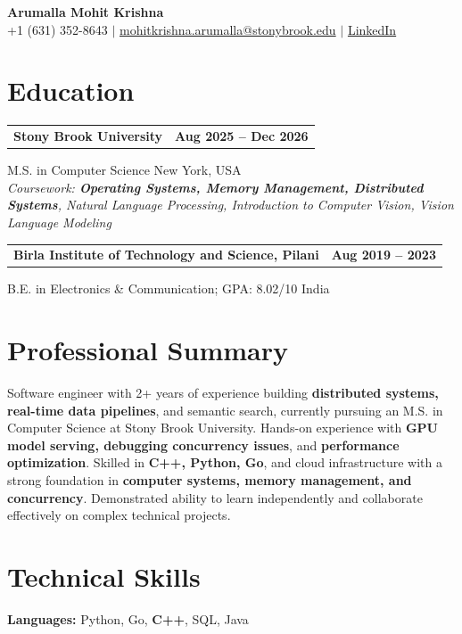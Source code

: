 \documentclass[letterpaper,10pt]{article}
\makeatletter
\newcommand{\entry}[2]{%
  \noindent
  \begin{tabularx}{\linewidth}
    {@{}>{\raggedright\arraybackslash}X@{\hspace{6pt}}r@{}}
    \textbf{#1} & #2
  \end{tabularx}\par
}
\makeatother
\begin{document}
\begin{center}
    {\LARGE\bfseries Arumalla Mohit Krishna}\\[3pt]
    +1 (631) 352-8643 $|$
    \href{mailto:mohitkrishna.arumalla@stonybrook.edu}
    {mohitkrishna.arumalla@stonybrook.edu} $|$
    \href{https://linkedin.com/in/mohit-krishna-arumalla}
    {LinkedIn}
\end{center}
\vspace{-8pt}

\section{Education}

\entry
  {\textbf{Stony Brook University}}
  {\textbf{Aug 2025 -- Dec 2026}}

M.S. in Computer Science \hfill New York, USA\\
\textit{
Coursework: \textbf{Operating Systems, Memory Management, Distributed Systems}, Natural Language Processing,
Introduction to Computer Vision, Vision Language Modeling
}
\vspace{3pt}

\entry
  {\textbf{Birla Institute of Technology and Science, Pilani}}
  {\textbf{Aug 2019 -- 2023}}

B.E. in Electronics \& Communication; GPA: 8.02/10 \hfill India
\section{Professional Summary}

Software engineer with 2+ years of experience building \textbf{distributed systems, real-time data pipelines}, and semantic search, currently pursuing an M.S. in Computer Science at Stony Brook University. Hands-on experience with \textbf{GPU model serving, debugging concurrency issues}, and \textbf{performance optimization}. Skilled in \textbf{C++, Python, Go}, and cloud infrastructure with a strong foundation in \textbf{computer systems, memory management, and concurrency}. Demonstrated ability to learn independently and collaborate effectively on complex technical projects.
\section{Technical Skills}

\textbf{Languages:}
Python, Go, \textbf{C++}, SQL, Java\\
\end{document}
